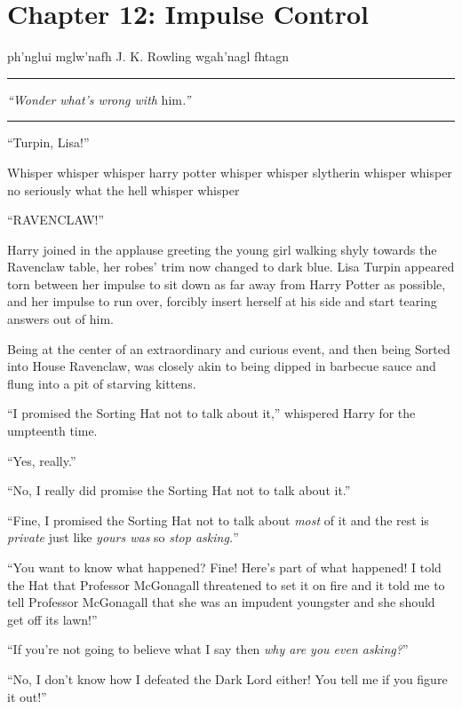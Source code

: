 \chapter{Chapter 12: Impulse Control}
ph'nglui mglw'nafh J. K. Rowling wgah'nagl fhtagn

\begin{center}\rule{3in}{0.4pt}\end{center}

\emph{``Wonder what's wrong with} him\emph{.''}

\begin{center}\rule{3in}{0.4pt}\end{center}

``Turpin, Lisa!''

Whisper whisper whisper harry potter whisper whisper slytherin whisper whisper no seriously what the hell whisper whisper

``RAVENCLAW!''

Harry joined in the applause greeting the young girl walking shyly towards the Ravenclaw table, her robes' trim now changed to dark blue. Lisa Turpin appeared torn between her impulse to sit down as far away from Harry Potter as possible, and her impulse to run over, forcibly insert herself at his side and start tearing answers out of him.

Being at the center of an extraordinary and curious event, and then being Sorted into House Ravenclaw, was closely akin to being dipped in barbecue sauce and flung into a pit of starving kittens.

``I promised the Sorting Hat not to talk about it,'' whispered Harry for the umpteenth time.

``Yes, really.''

``No, I really did promise the Sorting Hat not to talk about it.''

``Fine, I promised the Sorting Hat not to talk about \emph{most} of it and the rest is \emph{private} just like \emph{yours was} so \emph{stop asking.}''

``You want to know what happened? Fine! Here's part of what happened! I told the Hat that Professor McGonagall threatened to set it on fire and it told me to tell Professor McGonagall that she was an impudent youngster and she should get off its lawn!''

``If you're not going to believe what I say then \emph{why are you even asking?}''

``No, I don't know how I defeated the Dark Lord either! You tell me if you figure it out!''

